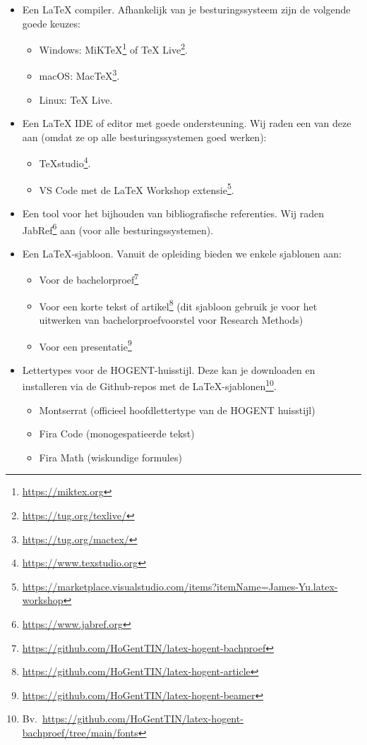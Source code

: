 \begin{itemize}
  \item Een {\LaTeX} compiler. Afhankelijk van je besturingssysteem zijn de volgende goede keuzes:
  \begin{itemize}
    \item Windows: MiKTeX\footnote{\url{https://miktex.org}} of TeX Live\footnote{\url{https://tug.org/texlive/}}.
    \item macOS: MacTeX\footnote{\url{https://tug.org/mactex/}}.
    \item Linux: TeX Live.
  \end{itemize}
  \item Een {\LaTeX} IDE of editor met goede ondersteuning. Wij raden een van deze aan (omdat ze op alle besturingssystemen goed werken):
  \begin{itemize}
    \item TeXstudio\footnote{\url{https://www.texstudio.org}}.
    \item VS Code met de LaTeX Workshop extensie\footnote{\url{https://marketplace.visualstudio.com/items?itemName=James-Yu.latex-workshop}}.
  \end{itemize}
  \item Een tool voor het bijhouden van bibliografische referenties. Wij raden JabRef\footnote{\url{https://www.jabref.org}} aan (voor alle besturingssystemen).
  \item Een {\LaTeX}-sjabloon. Vanuit de opleiding bieden we enkele sjablonen aan:
  \begin{itemize}
    \item Voor de bachelorproef\footnote{\url{https://github.com/HoGentTIN/latex-hogent-bachproef}}
    \item Voor een korte tekst of artikel\footnote{\url{https://github.com/HoGentTIN/latex-hogent-article}} (dit sjabloon gebruik je voor het uitwerken van bachelorproefvoorstel voor Research Methods)
    \item Voor een presentatie\footnote{\url{https://github.com/HoGentTIN/latex-hogent-beamer}}
  \end{itemize}
  \item Lettertypes voor de HOGENT-huisstijl. Deze kan je downloaden en installeren via de Github-repos met de {\LaTeX}-sjablonen\footnote{Bv.\ \url{https://github.com/HoGentTIN/latex-hogent-bachproef/tree/main/fonts}}.
  \begin{itemize}
    \item Montserrat (officieel hoofdlettertype van de HOGENT huisstijl)
    \item Fira Code (monogespatieerde tekst)
    \item Fira Math (wiskundige formules)
  \end{itemize}
\end{itemize}

